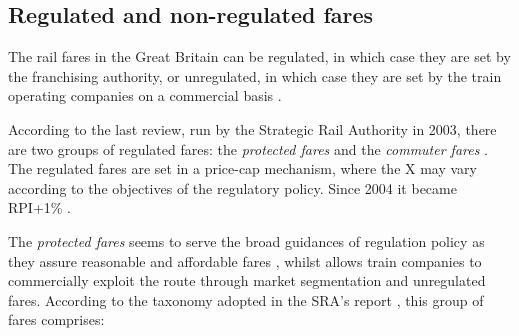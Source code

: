 




\subsection{Regulated and non-regulated fares}

The rail fares in the Great Britain can be regulated, in which case they are set by the franchising authority, or unregulated, in which case they are set by the train operating companies on a commercial basis \citep{fares-ticketing}. 

According to the last review, run by the Strategic Rail Authority in 2003, there are two groups of regulated fares: the \textit{protected fares} and the \textit{commuter fares} \citep{fares-ticketing}. The regulated fares are set in a price-cap mechanism, where the X may vary according to the objectives of the regulatory policy. Since 2004 it became RPI+1\% \citep{fares-ticketing}.

The \textit{protected fares} seems to serve the broad guidances of regulation policy as they assure reasonable and affordable fares \citep{fares-ticketing}, whilst allows train companies to commercially exploit the route through market segmentation and unregulated fares. According to the taxonomy adopted in the SRA's report \citep{sra-conclusions}, this group of fares comprises:

